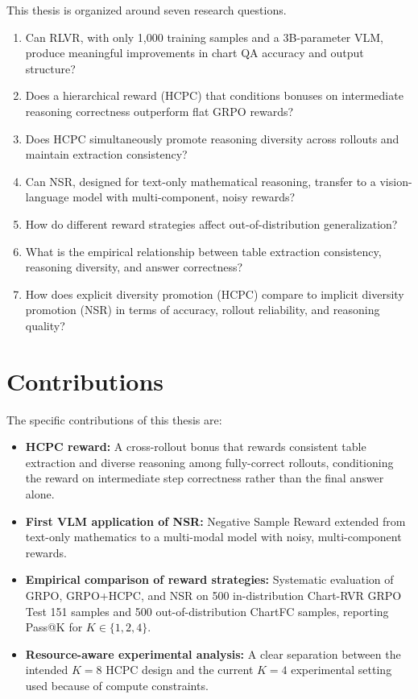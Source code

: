 \documentclass{iutbscthesis}
\begin{document}
This thesis is organized around seven research questions.

\begin{enumerate}
    \item Can RLVR, with only 1,000 training samples and a 3B-parameter VLM, produce meaningful improvements in chart QA accuracy and output structure?
    \item Does a hierarchical reward (HCPC) that conditions bonuses on intermediate reasoning correctness outperform flat GRPO rewards?
    \item Does HCPC simultaneously promote reasoning diversity across rollouts and maintain extraction consistency?
    \item Can NSR, designed for text-only mathematical reasoning, transfer to a vision-language model with multi-component, noisy rewards?
    \item How do different reward strategies affect out-of-distribution generalization?
    \item What is the empirical relationship between table extraction consistency, reasoning diversity, and answer correctness?
    \item How does explicit diversity promotion (HCPC) compare to implicit diversity promotion (NSR) in terms of accuracy, rollout reliability, and reasoning quality?
\end{enumerate}

\section{Contributions}

The specific contributions of this thesis are:

\begin{itemize}
    \item \textbf{HCPC reward:} A cross-rollout bonus that rewards consistent table extraction and diverse reasoning among fully-correct rollouts, conditioning the reward on intermediate step correctness rather than the final answer alone.
    \item \textbf{First VLM application of NSR:} Negative Sample Reward extended from text-only mathematics to a multi-modal model with noisy, multi-component rewards.
    \item \textbf{Empirical comparison of reward strategies:} Systematic evaluation of GRPO, GRPO+HCPC, and NSR on 500 in-distribution Chart-RVR GRPO Test 151 samples and 500 out-of-distribution ChartFC samples, reporting Pass@K for $K \in \{1, 2, 4\}$.
    \item \textbf{Resource-aware experimental analysis:} A clear separation between the intended $K=8$ HCPC design and the current $K=4$ experimental setting used because of compute constraints.
\end{itemize}
\end{document}
